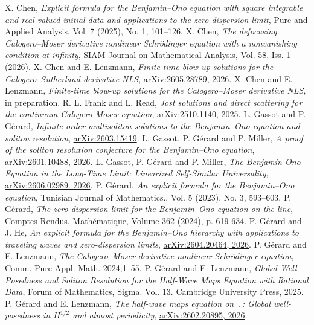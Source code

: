 \documentclass[10pt]{article}
\numberwithin{equation}{section}
\numberwithin{theorem}{section}
\begin{document}
\begin{thebibliography}{}
 {\sc X. Chen}, {\em Explicit formula for the Benjamin–Ono equation with square integrable and real valued initial data and applications to the zero dispersion limit}, Pure and Applied Analysis, Vol. 7 (2025), No. 1, 101–126.
 {\sc X. Chen}, {\em The defocusing Calogero–Moser derivative nonlinear Schrödinger equation with a nonvanishing condition at infinity}, SIAM Journal on Mathematical Analysis, Vol. 58, Iss. 1 (2026).
 {\sc X. Chen and E. Lenzmann}, {\em Finite-time blow-up solutions for the Calogero--Sutherland derivative NLS}, \href{https://arxiv.org/abs/2605.28789v1}{arXiv:2605.28789, 2026}.
 {\sc X. Chen and E. Lenzmann}, {\em Finite-time blow-up solutions for the Calogero--Moser derivative NLS}, in preparation.
 {\sc R. L. Frank and L. Read}, {\em Jost solutions and direct scattering for the continuum Calogero-Moser equation}, \href{https://arxiv.org/abs/2510.11403}{arXiv:2510.1140, 2025}.
 {\sc L. Gassot and P. Gérard}, {\em Infinite-order multisoliton solutions to the Benjamin--Ono equation and soliton resolution}, \href{https://arxiv.org/abs/2603.15419}{arXiv:2603.15419}.
 {\sc L. Gassot, P. Gérard and P. Miller}, {\em A proof of the soliton resolution conjecture for the Benjamin--Ono equation}, \href{https://arxiv.org/abs/2601.10488}{arXiv:2601.10488, 2026}.
 {\sc L. Gassot, P. Gérard and P. Miller}, {\em The Benjamin-Ono Equation in the Long-Time Limit: Linearized Self-Similar Universality}, \href{https://arxiv.org/abs/2606.02989}{arXiv:2606.02989. 2026}.
 {\sc P. Gérard}, {\em An explicit formula for the Benjamin–Ono equation}, Tunisian Journal of Mathematics., Vol. 5 (2023), No. 3, 593–603.
 {\sc P. Gérard}, {\em The zero dispersion limit for the Benjamin–Ono equation on the line}, Comptes Rendus. Mathématique, Volume 362 (2024), p. 619-634.
 {\sc P. Gérard and J. He}, {\em An explicit formula for the Benjamin--Ono hierarchy with applications to traveling waves and zero-dispersion limits}, \href{https://arxiv.org/abs/2604.20464}{arXiv:2604.20464, 2026}.
 {\sc P. Gérard and E. Lenzmann}, {\em The Calogero–Moser derivative nonlinear Schrödinger equation}, Comm. Pure Appl. Math. 2024;1–55.
 {\sc P. Gérard and E. Lenzmann}, {\em Global Well-Posedness and Soliton Resolution for the Half-Wave Maps Equation with Rational Data}, Forum of Mathematics, Sigma. Vol. 13. Cambridge University Press, 2025.
 {\sc P. Gérard and E. Lenzmann}, {\em The half-wave maps equation on $\mathbb{T}$: Global well-posedness in $H^{1/2}$ and almost periodicity}, \href{https://arxiv.org/abs/2602.20895}{arXiv:2602.20895, 2026}.

\end{thebibliography}
\end{document}

